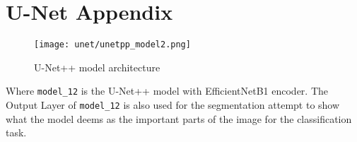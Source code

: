 \section{U-Net Appendix}\label{s:unetAppendix}

\begin{figure}[H]
  \begin{center}
    \texttt{[image: unet/unetpp\_model2.png]}
  \end{center}
  \caption{U-Net++ model architecture}\label{fig:unetpp_model}
\end{figure}

Where \texttt{model\_12} is the U-Net++ model with EfficientNetB1 encoder. The Output Layer of \texttt{model\_12} is also used for the segmentation attempt to show what the model deems as the important parts of the image for the classification task.

%
